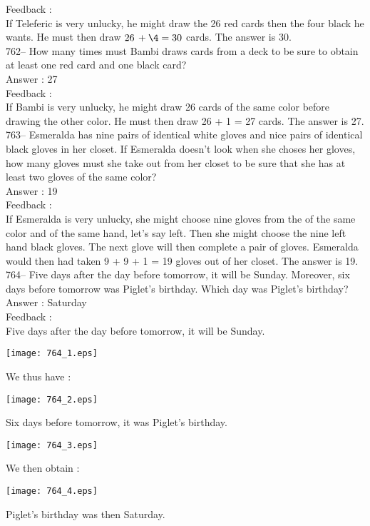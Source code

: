 \documentclass[letterpaper, 12pt]{article}
\begin{document}
Feedback : \\
If Teleferic is very unlucky, he might draw the 26 red cards then the four black he wants. He must then draw $26\,+\4=30$ cards.  The answer is 30.\\

762-- How many times must Bambi draws cards from a deck to be sure to obtain at least one red card and one black card?\\

Answer : 27\\

Feedback : \\
If Bambi is very unlucky, he might draw 26 cards of the same color before drawing the other color. He must then draw 26 + 1 = 27 cards. The answer is 27.\\

763-- Esmeralda has nine pairs of identical white gloves and nice pairs of identical black gloves in her closet. If Esmeralda doesn't look when she choses her gloves, how many gloves must she take out from her closet to be sure that she has at least two gloves of the same color?\\

Answer : 19\\

Feedback : \\
If Esmeralda is very unlucky, she might choose nine gloves from the of the same color and of the same hand, let's say left. Then she might choose the nine left hand black gloves. The next glove will then complete a pair of gloves. Esmeralda would then had taken 9 + 9 + 1 = 19 gloves out of her closet. The answer is 19.\\

764-- Five days after the day before tomorrow, it will be Sunday. Moreover, six days before tomorrow was Piglet's birthday. Which day was Piglet's birthday?\\

Answer : Saturday\\

Feedback : \\
Five days after the day before tomorrow, it will be Sunday.\\
\begin{center}
\texttt{[image: 764\_1.eps]}
\end{center}
We thus have :\\
\begin{center}
\texttt{[image: 764\_2.eps]}
\end{center}
Six days before tomorrow, it was Piglet's birthday.\\
\begin{center}
\texttt{[image: 764\_3.eps]}
\end{center}
We then obtain :
\begin{center}
\texttt{[image: 764\_4.eps]}
\end{center}
Piglet's birthday was then Saturday.\\
\end{document}
